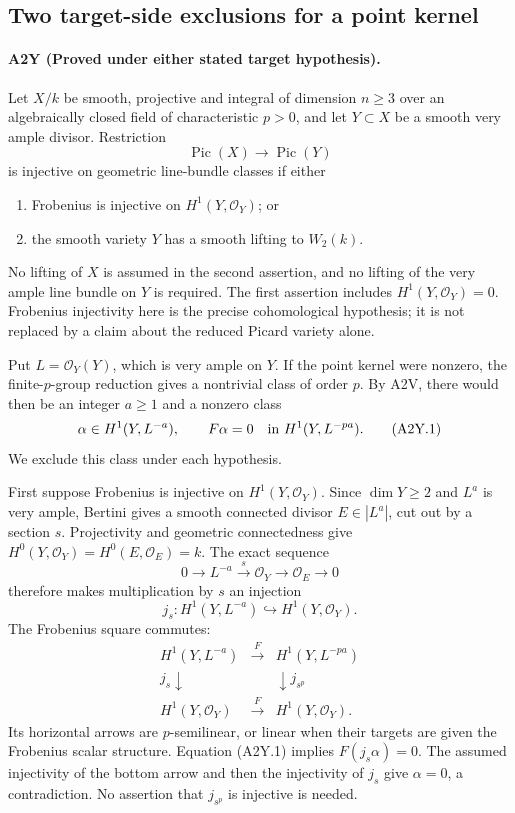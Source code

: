 \subsection{Two target-side exclusions for a point kernel}
\paragraph{A2Y (Proved under either stated target hypothesis).}
Let $X/k$ be smooth, projective and integral of dimension
$n\geq3$ over an algebraically closed field of characteristic
$p>0$, and let $Y\subset X$ be a smooth very ample divisor.
Restriction
\[
 \operatorname{Pic}(X)\longrightarrow\operatorname{Pic}(Y)
\]
is injective on geometric line-bundle classes if either
\begin{enumerate}
\item Frobenius is injective on $H^1(Y,\mathcal O_Y)$; or
\item the smooth variety $Y$ has a smooth lifting to $W_2(k)$.
\end{enumerate}
No lifting of $X$ is assumed in the second assertion, and no
lifting of the very ample line bundle on $Y$ is required.
The first assertion includes $H^1(Y,\mathcal O_Y)=0$.
Frobenius injectivity here is the precise cohomological
hypothesis; it is not replaced by a claim about the reduced
Picard variety alone.

Put $L=\mathcal O_Y(Y)$, which is very ample on $Y$.
If the point kernel were nonzero, the finite-$p$-group
reduction gives a nontrivial class of order $p$. By A2V,
there would then be an integer $a\geq1$ and a nonzero class
\[
 \alpha\in H^1(Y,L^{-a}),\qquad F\alpha=0
       \quad\hbox{in }H^1(Y,L^{-pa}).                  \tag{A2Y.1}
\]
We exclude this class under each hypothesis.

First suppose Frobenius is injective on $H^1(Y,\mathcal O_Y)$.
Since $\dim Y\geq2$ and $L^a$ is very ample, Bertini gives
a smooth connected divisor $E\in|L^a|$, cut out by a section
$s$. Projectivity and geometric connectedness give
$H^0(Y,\mathcal O_Y)=H^0(E,\mathcal O_E)=k$. The exact
sequence
\[
 0\longrightarrow L^{-a}\xrightarrow{\,s\,}\mathcal O_Y
  \longrightarrow\mathcal O_E\longrightarrow0
\]
therefore makes multiplication by $s$ an injection
\[
 j_s:H^1(Y,L^{-a})\hookrightarrow H^1(Y,\mathcal O_Y).
\]
The Frobenius square commutes:
\[
\begin{array}{ccc}
 H^1(Y,L^{-a})&\xrightarrow{\ F\ }&H^1(Y,L^{-pa})\\
 {\scriptstyle j_s}\downarrow&&\downarrow{\scriptstyle j_{s^p}}\\
 H^1(Y,\mathcal O_Y)&\xrightarrow{\ F\ }&H^1(Y,\mathcal O_Y).
\end{array}
\]
Its horizontal arrows are $p$-semilinear, or linear when
their targets are given the Frobenius scalar structure.
Equation (A2Y.1) implies $F(j_s\alpha)=0$. The assumed
injectivity of the bottom arrow and then the injectivity of
$j_s$ give $\alpha=0$, a contradiction. No assertion that
$j_{s^p}$ is injective is needed.

